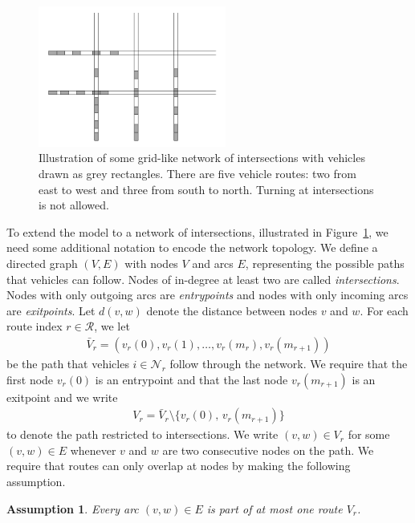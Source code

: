\documentclass[a4paper]{article}
\theoremstyle{definition}
\theoremstyle{plain}
\newtheorem{assump}{Assumption}
\begin{document}
\begin{figure}
  \centering
  \includegraphics[width=0.55\textwidth]{figures/state_example.png}
  \caption{Illustration of some grid-like network of intersections with vehicles
    drawn as grey rectangles. There are five vehicle routes: two from east to
    west and three from south to north. Turning at intersections is not
    allowed.}\label{fig:network_illustration}
\end{figure}

To extend the model to a network of intersections, illustrated in Figure~\ref{fig:network_illustration}, we
need some additional notation to encode the network topology.
We define a directed graph $(V,E)$ with nodes $V$ and arcs $E$, representing the
possible paths that vehicles can follow. Nodes of in-degree at least two are
called \textit{intersections}. Nodes with only outgoing arcs are
\textit{entrypoints} and nodes with only incoming arcs are \textit{exitpoints}.
%
Let $d(v, w)$ denote the distance between nodes $v$ and $w$.
%
For each route index $r \in \mathcal{R}$, we let
\begin{align}
  \bar{V}_{r} = (v_{r}(0), v_{r}(1), \dots, v_{r}(m_{r}), v_{r}(m_{r+1}))
\end{align}
be the path that vehicles $i \in \mathcal{N}_{r}$ follow through the network. We
require that the first node $v_{r}(0)$ is an entrypoint and that the last node
$v_{r}(m_{r+1})$ is an exitpoint and we write
\begin{align}
  V_{r} = \bar{V}_{r} \setminus \{ v_{r}(0), \, v_{r}(m_{r+1}) \}
\end{align}
to denote the path restricted to intersections. We write $(v, w) \in V_{r}$ for
some $(v, w) \in E$ whenever $v$ and $w$ are two consecutive nodes on the path.
We require that routes can only overlap at nodes by making the following assumption.

\begin{assump}\label{assump:disjoint_routes}
  Every arc $(v,w) \in E$ is part of at most one route $V_{r}$.
\end{assump}
\end{document}
